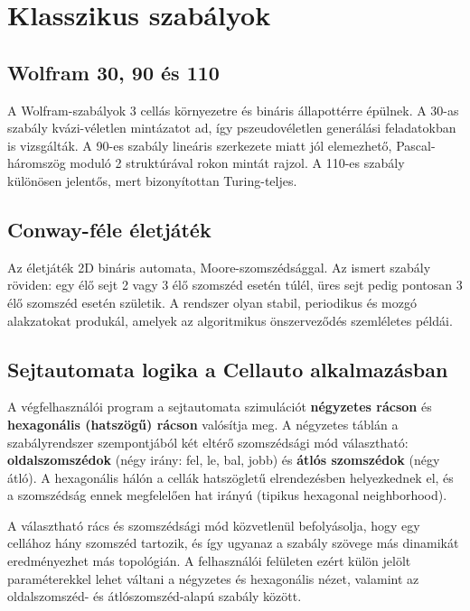 \documentclass{thesis-ekf}
\begin{document}
\section{Klasszikus szabályok}\label{sec:klasszikus-szabalyok}
\subsection{Wolfram 30, 90 és 110}
A Wolfram-szabályok 3 cellás környezetre és bináris állapottérre épülnek. A 30-as szabály kvázi-véletlen mintázatot ad, így pszeudovéletlen generálási feladatokban is vizsgálták. A 90-es szabály lineáris szerkezete miatt jól elemezhető, Pascal-háromszög moduló 2 struktúrával rokon mintát rajzol. A 110-es szabály különösen jelentős, mert bizonyítottan Turing-teljes.

\subsection{Conway-féle életjáték}
Az életjáték 2D bináris automata, Moore-szomszédsággal. Az ismert szabály röviden: egy élő sejt 2 vagy 3 élő szomszéd esetén túlél, üres sejt pedig pontosan 3 élő szomszéd esetén születik. A rendszer olyan stabil, periodikus és mozgó alakzatokat produkál, amelyek az algoritmikus önszerveződés szemléletes példái.

\subsection{Sejtautomata logika a Cellauto alkalmazásban}
A végfelhasználói program a sejtautomata szimulációt \textbf{négyzetes rácson} és \textbf{hexagonális (hatszögű) rácson} valósítja meg. A négyzetes táblán a szabályrendszer szempontjából két eltérő szomszédsági mód választható: \textbf{oldalszomszédok} (négy irány: fel, le, bal, jobb) és \textbf{átlós szomszédok} (négy átló). A hexagonális hálón a cellák hatszögletű elrendezésben helyezkednek el, és a szomszédság ennek megfelelően hat irányú (tipikus hexagonal neighborhood).

A választható rács és szomszédsági mód közvetlenül befolyásolja, hogy egy cellához hány szomszéd tartozik, és így ugyanaz a szabály szövege más dinamikát eredményezhet más topológián. A felhasználói felületen ezért külön jelölt paraméterekkel lehet váltani a négyzetes és hexagonális nézet, valamint az oldalszomszéd- és átlószomszéd-alapú szabály között.
\end{document}
